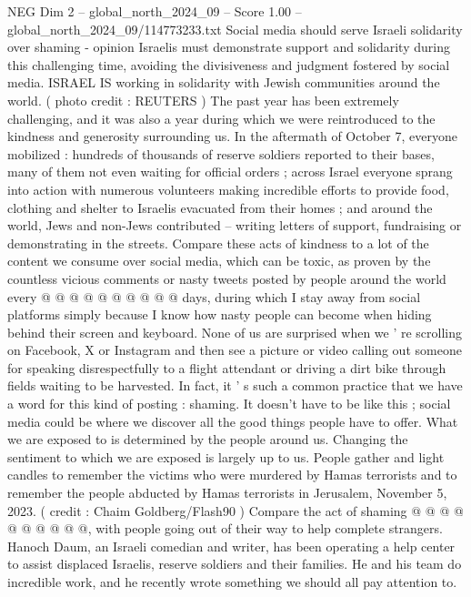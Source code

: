 \begin{textsample}{NEG Dim 2 – global\_north\_2024\_09 – Score 1.00 – global\_north\_2024\_09/114773233.txt}  \label{ex:f2_neg_317}
Social media should serve Israeli solidarity over shaming - opinion Israelis must demonstrate support and solidarity during this challenging time, avoiding the divisiveness and judgment fostered by social media.
ISRAEL IS working in solidarity with Jewish communities around the world. ( photo credit : REUTERS ) The past year has been extremely challenging, and it was also a year during which we were reintroduced to the kindness and generosity surrounding us.
In the aftermath of October 7, everyone mobilized : hundreds of thousands of reserve soldiers reported to their bases, many of them not even waiting for official orders ; across Israel everyone sprang into action with numerous volunteers making incredible efforts to provide food, clothing and shelter to Israelis evacuated from their homes ; and around the world, Jews and non-Jews contributed -- writing letters of support, fundraising or demonstrating in the streets.
Compare these acts of kindness to a lot of the content we consume over social media, which can be toxic, as proven by the countless vicious comments or nasty tweets posted by people around the world every @ @ @ @ @ @ @ @ @ @ days, during which I stay away from social platforms simply because I know how nasty people can become when hiding behind their screen and keyboard.
None of us are surprised when we ' re scrolling on Facebook, X or Instagram and then see a picture or video calling out someone for speaking disrespectfully to a flight attendant or driving a dirt bike through fields waiting to be harvested.
In fact, it ' s such a common practice that we have a word for this kind of posting : shaming.
It doesn't have to be like this ; social media could be where we discover all the good things people have to offer.
What we are exposed to is determined by the people around us.
Changing the sentiment to which we are exposed is largely up to us.
People gather and light candles to remember the victims who were murdered by Hamas terrorists and to remember the people abducted by Hamas terrorists in Jerusalem, November 5, 2023. ( credit : Chaim Goldberg/Flash90 ) Compare the act of shaming @ @ @ @ @ @ @ @ @ @, with people going out of their way to help complete strangers.
Hanoch Daum, an Israeli comedian and writer, has been operating a help center to assist displaced Israelis, reserve soldiers and their families.
He and his team do incredible work, and he recently wrote something we should all pay attention to.

\end{textsample}
